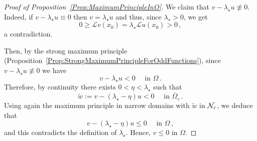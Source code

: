 \begin{proof}[Proof of Proposition~\ref{Prop:MaximumPrincipleInO}]
	We claim that $v - \lambda_\star u \not \equiv 0$. Indeed, if $v - \lambda_\star u \equiv 0$ then $v = \lambda_\star u$ and thus, since $\lambda_\star > 0$, we get
	$$
	0 \geq \mathscr{L} v(x_0) = \lambda_\star \mathscr{L} u(x_0) > 0\,, 
	$$
	a contradiction.
	
	Then, by the strong maximum principle (Proposition~\ref{Prop:StrongMaximumPrincipleForOddFunctions}), since $v - \lambda_\star u \not \equiv 0$ we have
	$$
	v - \lambda_\star u < 0 \quad \textrm{ in }\Omega\,.
	$$
	Therefore, by continuity there exists $0 < \eta <\lambda_\star$ such that 
	$$
	\tilde{w} := v - (\lambda_\star - \eta) u < 0 \quad \textrm{ in }\overline{\Omega}_\varepsilon\,.
	$$
	Using again the maximum principle in narrow domains with $\tilde{w}$ in $\mathcal{N}_\varepsilon$, we deduce that 
	$$
	v - (\lambda_\star - \eta) u \leq 0 \quad \textrm{ in }\Omega\,,
	$$
	and this contradicts the definition of $\lambda_\star$. Hence, $v\leq 0$ in $\Omega$.
\end{proof}

